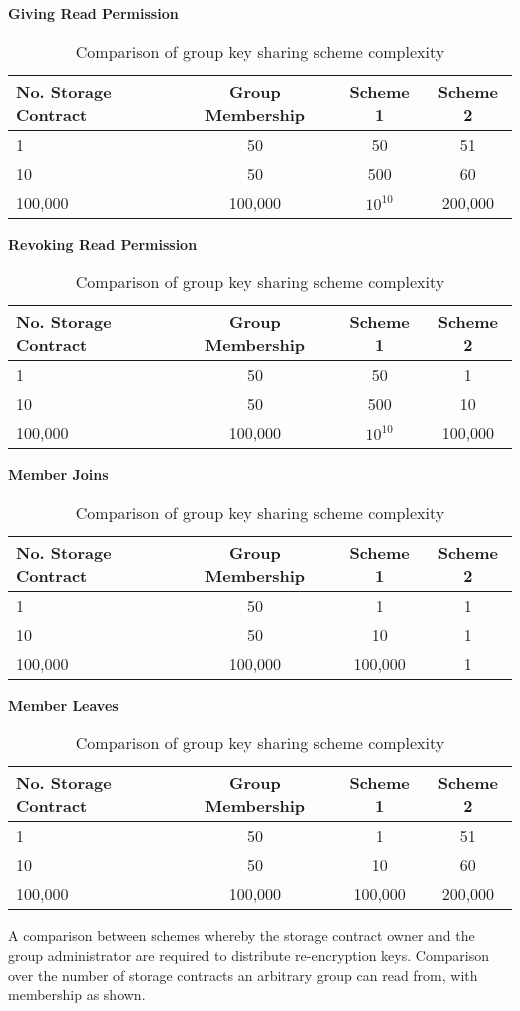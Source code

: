 \begin{table}[H]
  \centering
  
  \textbf{Giving Read Permission} \\
  \begin{tabular}{ | l | c | c | c | }
    \hline
    No. Storage Contract & Group Membership & Scheme 1 & Scheme 2 \\
    \hline
    1 & 50 & 50 & 51 \\
    10 & 50 & 500 & 60 \\
    100,000 & 100,000 & $10^{10}$ & 200,000 \\
    \hline
  \end{tabular}
  
  \vspace{5mm}
  
  \textbf{Revoking Read Permission} \\
  \begin{tabular}{ | l | c | c | c | }
    \hline
    No. Storage Contract & Group Membership & Scheme 1 & Scheme 2 \\
    \hline
    1 & 50 & 50 & 1 \\
    10 & 50 & 500 & 10 \\
    100,000 & 100,000 & $10^{10}$ & 100,000 \\
    \hline
  \end{tabular}
  
  \vspace{5mm}
  
  \textbf{Member Joins} \\
  \begin{tabular}{ | l | c | c | c | }
    \hline
    No. Storage Contract & Group Membership & Scheme 1 & Scheme 2 \\
    \hline
    1 & 50 & 1 & 1 \\
    10 & 50 & 10 & 1 \\
    100,000 & 100,000 & 100,000 & 1 \\
    \hline
  \end{tabular}
  
  \vspace{5mm}
  
  \textbf{Member Leaves} \\
  \begin{tabular}{ | l | c | c | c | }
    \hline
    No. Storage Contract & Group Membership & Scheme 1 & Scheme 2 \\
    \hline
    1 & 50 & 1 & 51 \\
    10 & 50 & 10 & 60 \\
    100,000 & 100,000 & 100,000 & 200,000 \\
    \hline
  \end{tabular}
  
  \caption{
    Comparison of group key sharing scheme complexity
  }{
    A comparison between schemes whereby the storage contract owner and the group administrator are required to distribute re-encryption keys. Comparison over the number of storage contracts an arbitrary group can read from, with membership as shown.
  }
  \label{table:group_key_sharing_scheme_comparison}
\end{table}

